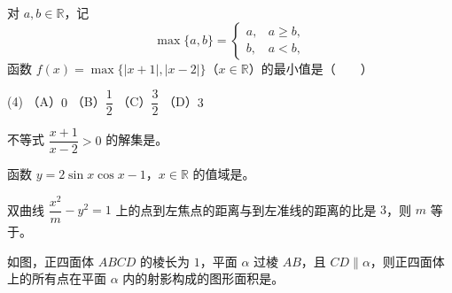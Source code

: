 \begin{question}
对 $a,b\in\mathbb R$，记
\nopagebreak[4]
\[
\max\{a,b\}=\begin{cases}a,&a\geqslant b,\\b,&a<b,\end{cases}
\]
函数 $f(x)=\max\{|x+1|,|x-2|\}$（$x\in\mathbb R$）的最小值是\mbox{（　　）}

\begin{gkopts}(4)
\task （A）$0$
\task （B）$\dfrac12$
\task （C）$\dfrac32$
\task （D）$3$
\end{gkopts}

\end{question}

\begin{question}
不等式 $\dfrac{x+1}{x-2}>0$ 的解集是\gkblank{}。

\end{question}
\begin{question}
函数 $y=2\sin x\cos x-1$，$x\in\mathbb R$ 的值域是\gkblank{}。

\end{question}
\begin{question}
双曲线 $\dfrac{x^2}{m}-y^2=1$ 上的点到左焦点的距离与到左准线的距离的比是 $3$，则 $m$ 等于\gkblank{}。

\Needspace{0.4\textheight}
\end{question}
\begin{question}
如图，正四面体 $ABCD$ 的棱长为 $1$，平面 $\alpha$ 过棱 $AB$，且 $CD\parallel\alpha$，则正四面体上的所有点在平面 $\alpha$ 内的射影构成的图形面积是\gkblank{}。
\nopagebreak[4]
\begin{center}\end{center}
\nopagebreak[4]
\end{question}

